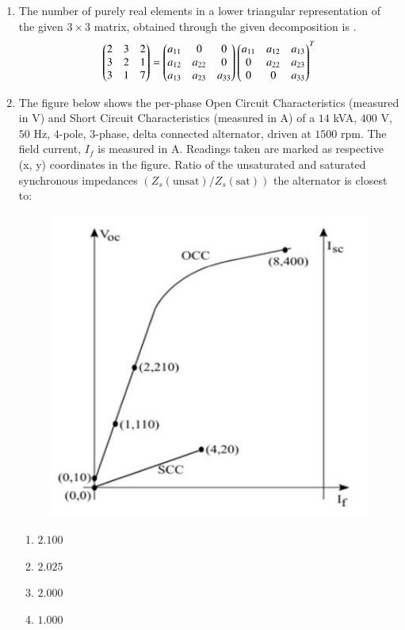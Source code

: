 \documentclass[journal,12pt,onecolumn]{IEEEtran}
\theoremstyle{remark}
\begin{document}
\begin{enumerate}[start=1, label=Q.\arabic*]
\item The number of purely real elements in a lower triangular representation of the given $3\times3$ matrix, obtained through the given decomposition is \underline{\hspace{2cm}}.
\[
\begin{pmatrix}2 & 3 & 2 \\ 3 & 2 & 1 \\ 3 & 1 & 7\end{pmatrix} 
= 
\begin{pmatrix}a_{11} & 0 & 0 \\ a_{12} & a_{22} & 0 \\ a_{13} & a_{23} & a_{33}\end{pmatrix}
\begin{pmatrix}a_{11} & a_{12} & a_{13} \\ 0 & a_{22} & a_{23} \\ 0 & 0 & a_{33}\end{pmatrix}^T
\]
\begin{enumerate}
\end{enumerate}
\hfill {}

\item The figure below shows the per-phase Open Circuit Characteristics (measured in V) and Short Circuit Characteristics (measured in A) of a $14$ kVA, $400$ V, $50$ Hz, $4$-pole, $3$-phase, delta connected alternator, driven at $1500$ rpm. The field current, $I_f$ is measured in A. Readings taken are marked as respective (x, y) coordinates in the figure. Ratio of the unsaturated and saturated synchronous impedances $(Z_s(\text{unsat}) / Z_s(\text{sat}))$ the alternator is closest to:
    \begin{figure}[H]
        \centering
        \includegraphics[width=0.6\columnwidth]{Figures/qs53.png}
        \caption{}
    \end{figure}
    \begin{enumerate}
        \item $2.100$
        \item $2.025$
        \item $2.000$
        \item $1.000$
    \end{enumerate}


\end{enumerate}
\end{document}
